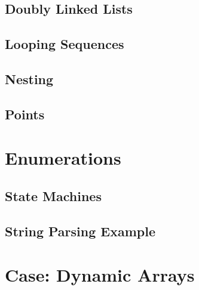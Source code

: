 
\subsection{Doubly Linked Lists}

\subsection{Looping Sequences}

\subsection{Nesting}

\subsection{Points}

\section{Enumerations}

\subsection{State Machines}

\subsection{String Parsing Example}

\section{Case: Dynamic Arrays}

